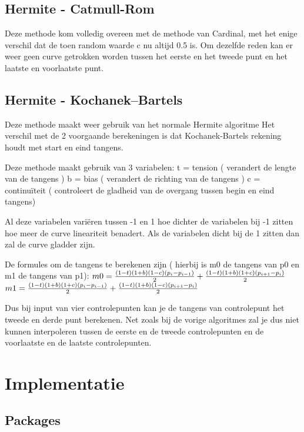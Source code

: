 \documentclass[a4paper,11pt,oneside, titlepage]{article}
\begin{document}
\subsection{Hermite - Catmull-Rom}
Deze methode kom volledig overeen met de methode van Cardinal, met het enige verschil dat
de toen random waarde c nu altijd 0.5 is. Om dezelfde reden kan er weer geen curve getrokken
worden tussen het eerste en het tweede punt en het laatste en voorlaatste punt.
\subsection{Hermite - Kochanek–Bartels}
Deze methode maakt weer gebruik van het normale Hermite algoritme Het verschil
met de 2 voorgaande berekeningen is dat Kochanek-Bartels rekening houdt met start en eind
tangens.

Deze methode maakt gebruik van 3 variabelen:\newline
t = tension ( verandert de lengte van de tangens )\newline
b = bias ( verandert de richting van de tangens )\newline
c = continu\"iteit ( controleert de gladheid van de overgang tussen begin en eind tangens)
\newline

Al deze variabelen vari\"eren tussen -1 en 1 hoe dichter de variabelen bij -1 zitten hoe
meer de curve lineariteit benadert. Als de variabelen dicht bij de 1 zitten dan zal de curve
gladder zijn.\newline

De formules om de tangens te berekenen zijn ( hierbij is m0 de tangens van p0 en m1 de tangens
van p1):\newline
$m0 = {{(1-t)(1+b)(1-c)(p_i-p_{i-1})}\over{2}} + {{(1-t)(1+b)(1+c)(p_{i+1}-p_i)}\over{2}}$\newline
$m1 = {{(1-t)(1+b)(1+c)(p_i-p_{i-1})}\over{2}} + {{(1-t)(1+b)(1-c)(p_{i+1}-p_i)}\over{2}}$\newline

Dus bij input van vier controlepunten kan je de tangens van controlepunt het tweede en derde
punt berekenen. Net zoals bij de vorige algoritmes zal je dus niet kunnen interpoleren tussen
de eerste en de tweede controlepunten en de voorlaatste en de laatste controlepunten.
\newpage
\section{Implementatie}
\subsection{Packages}
\end{document}
